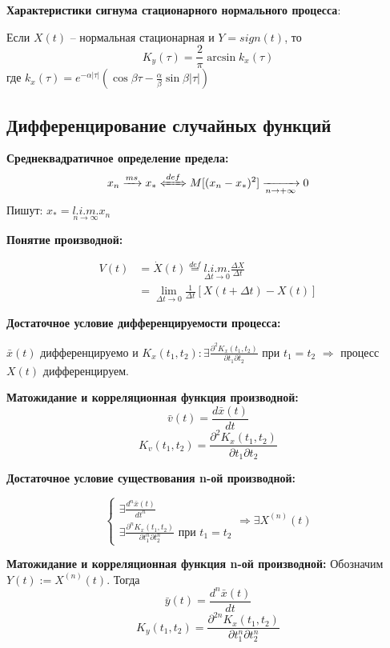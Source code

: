 \documentclass[a4paper,11pt, twocolumn]{article}
\newcommand{\defeq}{\overset{def}=}
\begin{document}
\textbf{Характеристики сигнума стационарного нормального процесса}:

Если $ X(t) $ -- нормальная стационарная и $ Y = sign(t) $, то
$$ K_y(\tau) = \frac{2}{\pi} \arcsin k_x(\tau) $$
где $ k_x(\tau) = e^{- \alpha |\tau|} \left( \cos \beta \tau - \frac{\alpha}{\beta} \sin \beta |\tau| \right) $

\subsection{Дифференцирование случайных  функций}

\textbf{ Среднеквадратичное определение предела: }
\[ x_n \xrightarrow{ms} x_* \xLeftrightarrow{def} M[(x_n-x_*)^2] \xrightarrow[n \to + \infty]{} 0  \]
Пишут: $ x_* = \underset{n \to \infty}{l.i.m.} x_n  $

\textbf{ Понятие производной: }

\begin{align*}
    V(t) & = \dot X(t) \defeq \underset{\Delta t \to 0}{l.i.m.} \frac{\Delta X}{\Delta t} \\
         & = \lim\limits_{\Delta t \to 0} \frac{1}{\Delta t} [ X(t + \Delta t) - X(t) ]
\end{align*}

\textbf{ Достаточное условие дифференцируемости процесса: }

$ \bar x(t) $ дифференцируемо и $ K_x(t_1,t_2): \exists \frac{ \partial^2 K_x(t_1,t_2) }{\partial t_1 \partial t_2} $ при $ t_1=t_2 $ $ \Rightarrow $ процесс $ X(t) $ дифференцируем.

\textbf{ Матожидание и корреляционная функция производной: }
\[ \bar v(t) = \frac{d \bar x(t)}{d t} \]
\[ K_v(t_1,t_2) = \frac{ \partial^2 K_x(t_1,t_2) }{\partial t_1 \partial t_2} \]

\textbf{ Достаточное условие существования n-ой производной: }

$$ \begin{cases}
    \exists \frac{d^n \bar x(t)}{d t^n} \\
    \exists  \frac{ \partial^n K_x(t_1,t_2) }{\partial t_1^n \partial t_2^n} \text{ при } t_1=t_2
\end{cases} \Rightarrow
\exists X^{(n)}(t) $$

\textbf{ Матожидание и корреляционная функция n-ой производной: }
Обозначим $ Y(t) := X^{(n)}(t) $.
Тогда
\[ \bar y(t) = \frac{d^n \bar x(t)}{d t} \]
\[ K_y(t_1,t_2) = \frac{ \partial^{2n} K_x(t_1,t_2) }{\partial t_1^n \partial t_2^n } \]
\end{document}
